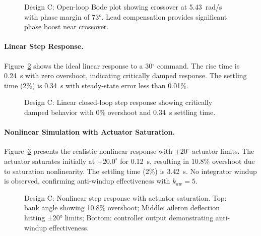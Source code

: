 \begin{figure}[h!]
\centering
\resizebox{0.75\textwidth}{!}{}
\caption{Design C: Open-loop Bode plot showing crossover at 5.43~rad/s with phase margin of 73°. Lead compensation provides significant phase boost near crossover.}
\label{fig:design_C_bode}
\end{figure}

\paragraph{Linear Step Response.}
Figure~\ref{fig:design_C_step} shows the ideal linear response to a 30$^\circ$ command. The rise time is 0.24~s with zero overshoot, indicating critically damped response. The settling time (2\%) is 0.34~s with steady-state error less than 0.01\%.

\begin{figure}[h!]
\centering
\resizebox{0.7\textwidth}{!}{}
\caption{Design C: Linear closed-loop step response showing critically damped behavior with 0\% overshoot and 0.34~s settling time.}
\label{fig:design_C_step}
\end{figure}

\paragraph{Nonlinear Simulation with Actuator Saturation.}
Figure~\ref{fig:nonlinear_response} presents the realistic nonlinear response with $\pm20^\circ$ actuator limits. The actuator saturates initially at $+20.0^\circ$ for 0.12~s, resulting in 10.8\% overshoot due to saturation nonlinearity. The settling time (2\%) is 3.42~s. No integrator windup is observed, confirming anti-windup effectiveness with $k_{aw}=5$.

\begin{figure}[h!]
\centering
\resizebox{0.95\textwidth}{!}{}
\caption{Design C: Nonlinear step response with actuator saturation. Top: bank angle showing 10.8\% overshoot; Middle: aileron deflection hitting ±20° limits; Bottom: controller output demonstrating anti-windup effectiveness.}
\label{fig:nonlinear_response}
\end{figure}

